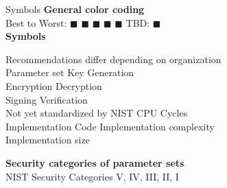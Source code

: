 \documentclass[11pt,english,a4paper, landscape]{scrartcl}
\begin{document}
	\begin{minipage}[t]{0.4\textwidth} %
		\vspace{-3mm}
		\begin{algorithmbox}{Symbols}
			\scriptsize
			{\bfseries  General color coding}\\[0.5\baselineskip]
			Best to Worst:
			\textcolor{themegreen}{$\blacksquare$}
			\textcolor{themeyellow}{$\blacksquare$}
			\textcolor{themeorange}{$\blacksquare$}
			\textcolor{themered}{$\blacksquare$}
			\textcolor{themered!65!black}{$\blacksquare$}\quad
			TBD: \textcolor{themeblue}{$\blacksquare$}\\[\baselineskip]

			{\bfseries  Symbols}
			\vspace{-0.5\baselineskip}
			\begin{tabbing}
				\textcolor{themegreydark}{\faExclamationCircle}\quad Recommendations differ depending on organization\\
				\=\textcolor{themegreydark}{\faSun[regular]}\quad Parameter set\hspace{3cm}
				\=\textcolor{themegreydark}{\faKey}\quad Key Generation\\
				\>\textcolor{themegreydark}{\faLock}\quad Encryption
				\>\textcolor{themegreydark}{\faUnlock}\quad Decryption\\
				\>\textcolor{themegreydark}{\faPen}\quad Signing
				\>\textcolor{themegreydark}{\faQuestionCircle}\quad Verification\\
				\>\textcolor{themegreydark}{\faCalendar}\quad Not yet standardized by NIST
				\>\textcolor{themegreydark}{\faMicrochip}\quad CPU Cycles\\
				\>\textcolor{themegreydark}{\faCode}\quad Implementation Code
				\>\hspace{-0.5mm}\hspace{-2mm} Implementation complexity\\
				\>\hspace{-1mm} Implementation size
			\end{tabbing}

			{\bfseries Security categories of parameter sets}\\[0.5\baselineskip]
			 NIST Security Categories V, IV, III, II, I\\[\baselineskip]


\end{algorithmbox}
\end{minipage}
\end{document}
